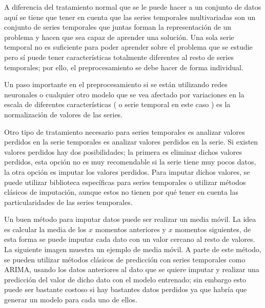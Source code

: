 A diferencia del tratamiento normal que se le puede hacer a  un conjunto de datos aquí se tiene que tener en cuenta que las series temporales multivariadas son un conjunto de series temporales que juntas forman la representación de un problema y hacen que sea capaz de aprender una solución. Una sola serie temporal no es suficiente para poder aprender sobre el problema que se estudie pero sí puede tener características totalmente diferentes al resto de series temporales; por ello, el preprocesamiento se debe hacer de forma individual.\newline

Un paso importante en el preprocesamiento si se están utilizando redes neuronales o cualquier otro modelo que se vea afectado por variaciones en la escala de diferentes características ( o serie temporal en este caso ) es la normalización de valores de las series.\newline

Otro tipo de tratamiento necesario para series temporales es analizar valores perdidos en la serie temporales es analizar valores perdidos en la serie. Si existen valores perdidos hay dos posibilidades; la primera es eliminar dichos valores perdidos, esta opción no es muy recomendable si la serie tiene muy pocos datos, la otra opción es imputar los valores perdidos. Para imputar dichos valores, se puede utilizar biblioteca específicas para series temporales o utilizar métodos clásicos de imputación, aunque estos no tienen por qué tener en cuenta las particularidades de las series temporales.\newline

Un buen método para imputar datos puede ser realizar un media móvil. La idea es calcular la media de los $x$ momentos anteriores y $x$ momentos siguientes, de esta forma se puede imputar cada dato con un valor cercano al resto de valores. La siguiente imagen muestra un ejemplo de media móvil. A parte de este método, se pueden utilizar métodos clásicos de predicción con series temporales como ARIMA, usando los datos anteriores al dato que se quiere imputar y realizar una predicción del valor de dicho dato con el modelo entrenado; sin embargo esto puede ser bastante costoso si hay bastantes datos perdidos ya que habría que generar un modelo para cada uno de ellos.\newline

